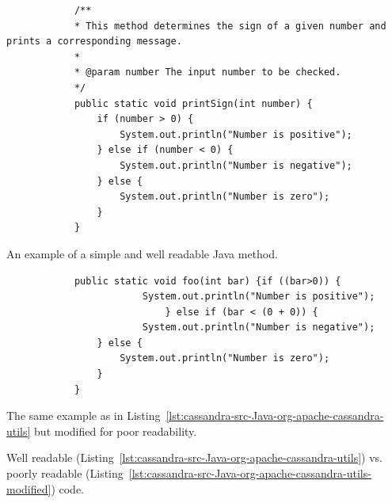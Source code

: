 \documentclass[%
class=scrreprt,
chapterprefix=false,%
open=right,%
twoside=false,%
paper=a4,%
logofile={Logo\_zentral\_farbig\_EN.png},%
thesistype=master,%
UKenglish,%
]{se2thesis}
\theoremstyle{definition}
\begin{document}
%	

\begin{listing}[tb]
	\begin{sublisting}{\linewidth}
		\begin{verbatim}
			/**
			* This method determines the sign of a given number and prints a corresponding message.
			*
			* @param number The input number to be checked.
			*/
			public static void printSign(int number) {							
				if (number > 0) {
					System.out.println("Number is positive");
				} else if (number < 0) {
					System.out.println("Number is negative");
				} else {
					System.out.println("Number is zero");
				}
			}
		\end{verbatim}
		\caption{An example of a simple and well readable Java method.}
		\label{lst:cassandra-src-Java-org-apache-cassandra-utils}
	\end{sublisting}
	\vspace{1pt}
	
	\begin{sublisting}{\linewidth}
		\begin{verbatim}
			public static void foo(int bar) {if ((bar>0)) {
						System.out.println("Number is positive");
							} else if (bar < (0 + 0)) {
						System.out.println("Number is negative");
				} else {
					System.out.println("Number is zero");
				}
			}
		\end{verbatim}
		\caption{The same example as in Listing~\ref{lst:cassandra-src-Java-org-apache-cassandra-utils} but modified for poor readability.}
		\label{lst:cassandra-src-Java-org-apache-cassandra-utils-modified}
	\end{sublisting}
	\caption{Well readable (Listing~\ref{lst:cassandra-src-Java-org-apache-cassandra-utils}) vs. poorly readable (Listing~\ref{lst:cassandra-src-Java-org-apache-cassandra-utils-modified}) code.}
\end{listing}
\end{document}
